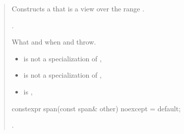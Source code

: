 \documentclass{wg21}
\begin{document}
\begin{quote}
\begin{addedblock}
\begin{itemdescr}
	\pnum
	\effects
	Constructs a  that is a view over the range .
	
	\pnum
	\ensures
	.
	
	\pnum
	\throws
	What and when  and  throw.
	
	\pnum
	\constraints
	\begin{itemize}
		\item {} is not a specialization of ,
		\item {} is not a specialization of ,
		\item {} is ,
	\end{itemize}
\end{itemdescr}
\end{addedblock}

\begin{itemdecl}
constexpr span(const span& other) noexcept = default;
\end{itemdecl}
\begin{itemdescr}
	\pnum
	\ensures
	.
\end{itemdescr}


\end{quote}
\end{document}
